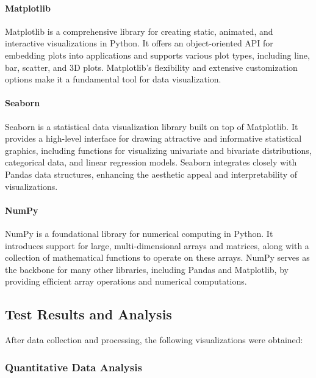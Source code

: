 \paragraph{Matplotlib}

Matplotlib is a comprehensive library for creating static, animated, and interactive visualizations in Python. It offers an object-oriented API for embedding plots into applications and supports various plot types, including line, bar, scatter, and 3D plots. Matplotlib's flexibility and extensive customization options make it a fundamental tool for data visualization.

\cite{matplotlib}

\paragraph{Seaborn}

Seaborn is a statistical data visualization library built on top of Matplotlib. It provides a high-level interface for drawing attractive and informative statistical graphics, including functions for visualizing univariate and bivariate distributions, categorical data, and linear regression models. Seaborn integrates closely with Pandas data structures, enhancing the aesthetic appeal and interpretability of visualizations.

\cite{seaborn}

\paragraph{NumPy}

NumPy is a foundational library for numerical computing in Python. It introduces support for large, multi-dimensional arrays and matrices, along with a collection of mathematical functions to operate on these arrays. NumPy serves as the backbone for many other libraries, including Pandas and Matplotlib, by providing efficient array operations and numerical computations.

\cite{numpy}

\subsection{Test Results and Analysis}

After data collection and processing, the following visualizations were obtained:

\subsubsection{Quantitative Data Analysis}

